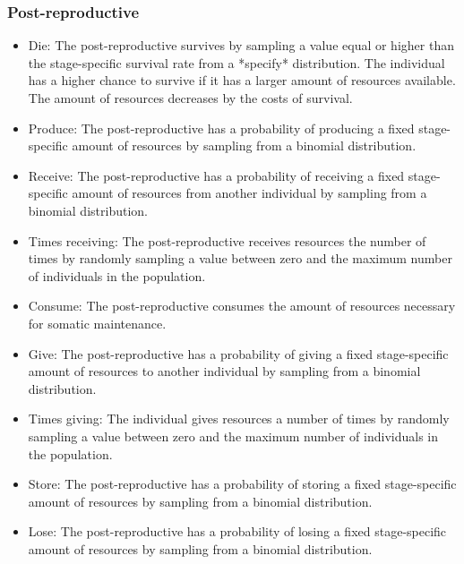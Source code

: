 \documentclass{article}
\begin{document}
\subsubsection{Post-reproductive}

\begin{itemize}
    \item Die: The post-reproductive survives by sampling a value equal or higher than the stage-specific survival rate from a *specify* distribution. The individual has a higher chance to survive if it has a larger amount of resources available. The amount of resources decreases by the costs of survival.
    \item Produce: The post-reproductive has a probability of producing a fixed stage-specific amount of resources by sampling from a binomial distribution.
    \item Receive: The post-reproductive has a probability of receiving a fixed stage-specific amount of resources from another individual by sampling from a binomial distribution.
    \item Times receiving: The post-reproductive receives resources the number of times by randomly sampling a value between zero and the maximum number of individuals in the population.
    \item Consume: The post-reproductive consumes the amount of resources necessary for somatic maintenance.
    \item Give: The post-reproductive has a probability of giving a fixed stage-specific amount of resources to another individual by sampling from a binomial distribution.
    \item Times giving: The individual gives resources a number of times by randomly sampling a value between zero and the maximum number of individuals in the population.
    \item Store: The post-reproductive has a probability of storing a fixed stage-specific amount of resources by sampling from a binomial distribution.
    \item Lose: The post-reproductive has a probability of losing a fixed stage-specific amount of resources by sampling from a binomial distribution.
\end{itemize}
\end{document}
